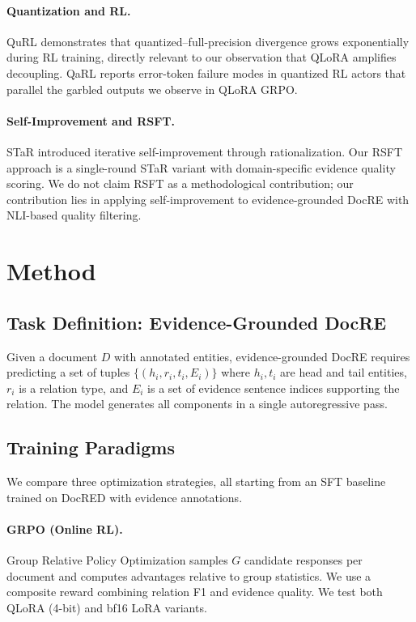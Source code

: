 \documentclass[11pt,a4paper]{article}
\begin{document}
\paragraph{Quantization and RL.}
QuRL \cite{qurl2024} demonstrates that quantized--full-precision divergence grows exponentially during RL training, directly relevant to our observation that QLoRA amplifies decoupling.
QaRL \cite{qarl2024} reports error-token failure modes in quantized RL actors that parallel the garbled outputs we observe in QLoRA GRPO.

\paragraph{Self-Improvement and RSFT.}
STaR \cite{zelikman2022star} introduced iterative self-improvement through rationalization.
Our RSFT approach is a single-round STaR variant with domain-specific evidence quality scoring.
We do not claim RSFT as a methodological contribution; our contribution lies in applying self-improvement to evidence-grounded DocRE with NLI-based quality filtering.

\section{Method}
\label{sec:method}

\subsection{Task Definition: Evidence-Grounded DocRE}

Given a document $D$ with annotated entities, evidence-grounded DocRE requires predicting a set of tuples $\{(h_i, r_i, t_i, E_i)\}$ where $h_i, t_i$ are head and tail entities, $r_i$ is a relation type, and $E_i$ is a set of evidence sentence indices supporting the relation.
The model generates all components in a single autoregressive pass.

\subsection{Training Paradigms}

We compare three optimization strategies, all starting from an SFT baseline trained on DocRED with evidence annotations.

\paragraph{GRPO (Online RL).}
Group Relative Policy Optimization \cite{shao2024deepseekmath} samples $G$ candidate responses per document and computes advantages relative to group statistics.
We use a composite reward combining relation F1 and evidence quality.
We test both QLoRA (4-bit) and bf16 LoRA variants.
\end{document}
